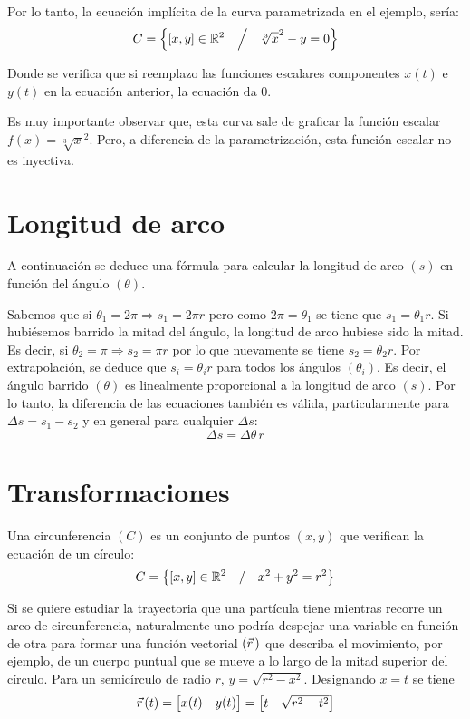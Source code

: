 \documentclass[a5paper,12pt,twoside]{book}
\begin{document}
Por lo tanto, la ecuación implícita de la curva parametrizada en el ejemplo, sería:
  \[ C = \left\{ [x,y] \in \mathbb{R}^2 \quad \Big/ \quad \sqrt[3]{x}^2 -y=0 \right\} \]

Donde se verifica que si reemplazo las funciones escalares componentes $x(t)$ e $y(t)$ en la ecuación anterior, la ecuación da 0.

Es muy importante observar que, esta curva sale de graficar la función escalar $f(x) = \sqrt[3]{x}^2$.
Pero, a diferencia de la parametrización, esta función escalar no es inyectiva.

\section{Longitud de arco}
\label{A:arcLength}

A continuación se deduce una fórmula para calcular la longitud de arco $(s)$ en función del ángulo $(\theta)$.

\begin{center}
    \def\svgwidth{0.4\linewidth}
    
\end{center}

Sabemos que si $\theta_1 = 2\pi \Rightarrow s_1 = 2 \pi r$ pero como $2 \pi = \theta_1$ se tiene que $s_1= \theta_1 r$.
Si hubiésemos barrido la mitad del ángulo, la longitud de arco hubiese sido la mitad.
Es decir, si $\theta_2 = \pi \Rightarrow s_2 = \pi r$ por lo que nuevamente se tiene $s_2= \theta_2 r$.
Por extrapolación, se deduce que $s_i = \theta_i r$ para todos los ángulos $(\theta_i)$.
Es decir, el ángulo barrido $(\theta)$ es linealmente proporcional a la longitud de arco $(s)$.
Por lo tanto, la diferencia de las ecuaciones también es válida, particularmente para $\Delta s = s_1-s_2$ y en general para cualquier $\Delta s$:
\[
  \Delta s = \Delta \theta \, r
\]

\section{Transformaciones}

Una circunferencia $(C)$ es un conjunto de puntos $(x,y)$ que verifican la ecuación de un círculo:
\[
    C = \left\{ [x,y] \in \mathbb{R}^2 \quad / \quad x^2 + y^2 = r^2 \right\}
\]

Si se quiere estudiar la trayectoria que una partícula tiene mientras recorre un arco de circunferencia, naturalmente uno podría despejar una variable en función de otra para formar una función vectorial $(\vec{r}\hspace{0.05cm})$ que describa el movimiento, por ejemplo, de un cuerpo puntual que se mueve a lo largo de la mitad superior del círculo.
Para un semicírculo de radio $r$, $y = \sqrt{r^2 - x^2}$.
Designando $x = t$ se tiene
\[
    \vec{r}\hspace{0.05cm}(t) = \begin{bmatrix} x(t) & y(t) \end{bmatrix} = \begin{bmatrix} t & \sqrt{r^2-t^2} \end{bmatrix}
\]
\end{document}

